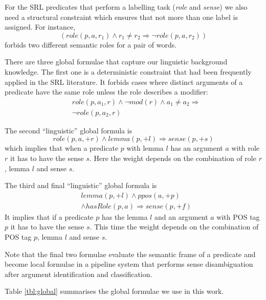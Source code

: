 
For the SRL predicates that perform a labelling task (\emph{role} and \emph{sense}) we also need a structural constraint which ensures that not more than one label is assigned. For instance,
\[
(role(p,a,r_1) \wedge r_1 \neq r_2 \Rightarrow \neg role(p,a,r_2)  )
\]
forbids two different semantic roles for a pair of words. 

There are three global formulae that capture our linguistic background knowledge. The first one is a deterministic constraint that had been frequently applied in the SRL literature. It forbids cases where distinct arguments of a predicate have the same role unless the role describes a modifier:
\begin{eqnarray*}
 &role\left(p,a_{1},r\right)\wedge \neg mod\left(r\right)\wedge a_{1}\neq a_{2}  \Rightarrow\\
  & \neg role\left(p,a_{2},r\right)
\end{eqnarray*}

The second ``linguistic'' global formula is
\[
role(p,a,+r) \wedge lemma(p,+l) \Rightarrow sense(p,+s) 
\]
which implies that when a predicate $p$ with lemma $l$ has an argument $a$ with role $r$ it has to have the sense $s$. Here the weight depends on the combination of role $r$, lemma $l$ and sense $s$.

The third and final ``linguistic'' global formula is
\begin{eqnarray*}
  & lemma(p,+l) \wedge ppos(a,+p)  \\
  & \wedge hasRole(p,a)  \Rightarrow sense(p,+f) 
\end{eqnarray*}
It implies that if a predicate $p$ has the lemma $l$ and an argument $a$ with POS tag $p$ it has to have the sense $s$. This time the weight depends on the combination of POS tag $p$, lemma $l$ and sense $s$.

Note that the final two formulae evaluate the semantic frame of a predicate and become local formulae in a pipeline system that performs sense disambiguation after argument identification and classification.

Table \ref{tbl:global} summarises the global formulae we use in this work. 

